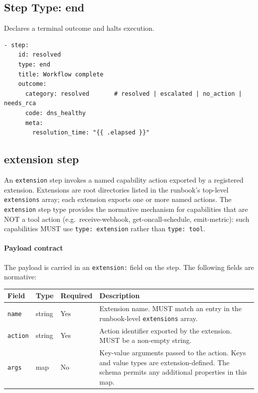 \subsection{Step Type: end}
\label{subsec:step-end}

Declares a terminal outcome and halts execution.

\begin{verbatim}
- step:
    id: resolved
    type: end
    title: Workflow complete
    outcome:
      category: resolved       # resolved | escalated | no_action | needs_rca
      code: dns_healthy
      meta:
        resolution_time: "{{ .elapsed }}"
\end{verbatim}

\subsection{extension step}
\label{subsec:step-extension}

An \texttt{extension} step invokes a named capability action exported by a
registered extension.  Extensions are root directories listed in the runbook's
top-level \texttt{extensions} array; each extension exports one or more named
actions.  The \texttt{extension} step type provides the normative mechanism for
capabilities that are NOT a tool action (e.g.\ receive-webhook,
get-oncall-schedule, emit-metric): such capabilities MUST use
\texttt{type:\ extension} rather than \texttt{type:\ tool}.

\paragraph{Payload contract}

The payload is carried in an \texttt{extension:} field on the step.  The
following fields are normative:

\begin{center}
\begin{tabular}{lllp{5cm}}
\hline
\textbf{Field}  & \textbf{Type}  & \textbf{Required} & \textbf{Description} \\
\hline
\texttt{name}   & string & Yes & Extension name.  MUST match an entry in the
                                  runbook-level \texttt{extensions} array. \\
\texttt{action} & string & Yes & Action identifier exported by the extension.
                                  MUST be a non-empty string. \\
\texttt{args}   & map    & No  & Key-value arguments passed to the action.
                                  Keys and value types are extension-defined.
                                  The schema permits any additional properties
                                  in this map. \\
\hline
\end{tabular}
\end{center}

